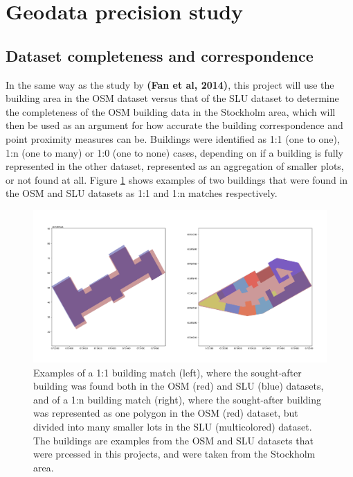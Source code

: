 \documentclass{kththesis}
\begin{document}
\section{Geodata precision study}

\subsection{Dataset completeness and correspondence}

In the same way as the study by \textbf{(Fan et al, 2014)}, this project will use the building area in the OSM dataset versus that of the SLU dataset to determine the completeness of the OSM building data in the Stockholm area, which will then be used as an argument for how accurate the building correspondence and point proximity measures can be.
Buildings were identified as 1:1 (one to one), 1:n (one to many) or 1:0 (one to none) cases, depending on if a building is fully represented in the other dataset, represented as an aggregation of smaller plots, or not found at all.
Figure \ref{fig:building-match-types} shows examples of two buildings that were found in the OSM and SLU datasets as 1:1 and 1:n matches respectively.

\begin{figure}[H]
    \centering
    \includegraphics[width=\textwidth,height=0.5\textheight,keepaspectratio]{img_building_match}
    \caption{Examples of a 1:1 building match (left), where the sought-after building was found both in the OSM (red) and SLU (blue) datasets, and of a 1:n building match (right), where the sought-after building was represented as one polygon in the OSM (red) dataset, but divided into many smaller lots in the SLU (multicolored) dataset. The buildings are examples from the OSM and SLU datasets that were prcessed in this projects, and were taken from the Stockholm area.}
    \label{fig:building-match-types}
\end{figure}
\end{document}
